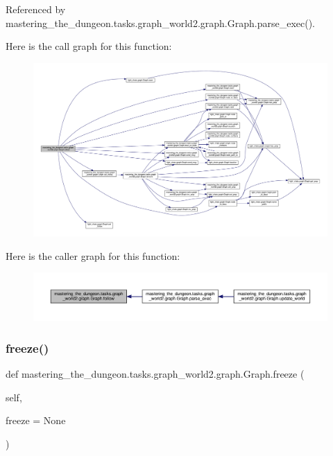 Referenced by mastering\+\_\+the\+\_\+dungeon.\+tasks.\+graph\+\_\+world2.\+graph.\+Graph.\+parse\+\_\+exec().

Here is the call graph for this function\+:
\nopagebreak
\begin{figure}[H]
\begin{center}
\leavevmode
\includegraphics[width=350pt]{classmastering__the__dungeon_1_1tasks_1_1graph__world2_1_1graph_1_1Graph_aa15fc9576acfd82be1d58fd75e42c746_cgraph}
\end{center}
\end{figure}
Here is the caller graph for this function\+:
\nopagebreak
\begin{figure}[H]
\begin{center}
\leavevmode
\includegraphics[width=350pt]{classmastering__the__dungeon_1_1tasks_1_1graph__world2_1_1graph_1_1Graph_aa15fc9576acfd82be1d58fd75e42c746_icgraph}
\end{center}
\end{figure}
\mbox{\label{classmastering__the__dungeon_1_1tasks_1_1graph__world2_1_1graph_1_1Graph_a240dae7d7d9f8bbaa53750d21e0d17c5}} 
\subsubsection{\texorpdfstring{freeze()}{freeze()}}
{\footnotesize\ttfamily def mastering\+\_\+the\+\_\+dungeon.\+tasks.\+graph\+\_\+world2.\+graph.\+Graph.\+freeze (\begin{DoxyParamCaption}\item[{}]{self,  }\item[{}]{freeze = {\ttfamily None} }\end{DoxyParamCaption})}



